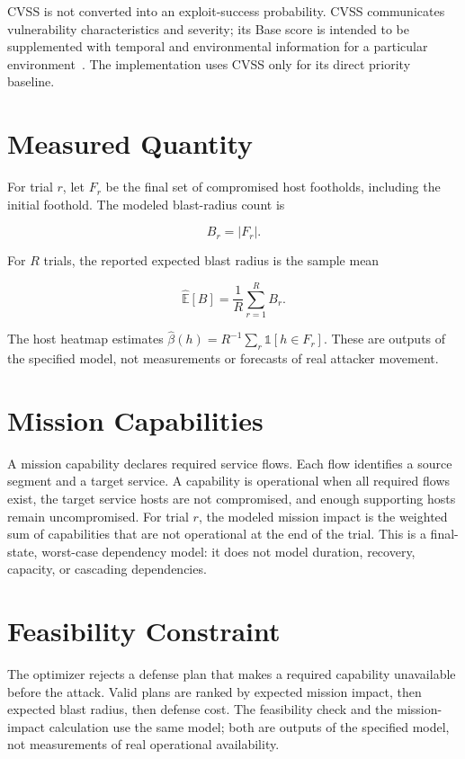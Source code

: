 CVSS is not converted into an exploit-success probability. CVSS communicates vulnerability characteristics and severity; its Base score is intended to be supplemented with temporal and environmental information for a particular environment~\cite{cvss31}. The implementation uses CVSS only for its direct priority baseline.

\section{Measured Quantity}

For trial $r$, let $F_r$ be the final set of compromised host footholds, including the initial foothold. The modeled blast-radius count is

\[
B_r = |F_r|.
\]

For $R$ trials, the reported expected blast radius is the sample mean

\[
\widehat{\mathbb{E}}[B] = \frac{1}{R}\sum_{r=1}^{R} B_r.
\]

The host heatmap estimates $\hat{\beta}(h) = R^{-1}\sum_r \mathbb{1}[h \in F_r]$. These are outputs of the specified model, not measurements or forecasts of real attacker movement.

\section{Mission Capabilities}

A mission capability declares required service flows. Each flow identifies a source segment and a target service. A capability is operational when all required flows exist, the target service hosts are not compromised, and enough supporting hosts remain uncompromised. For trial $r$, the modeled mission impact is the weighted sum of capabilities that are not operational at the end of the trial. This is a final-state, worst-case dependency model: it does not model duration, recovery, capacity, or cascading dependencies.

\section{Feasibility Constraint}

The optimizer rejects a defense plan that makes a required capability unavailable before the attack. Valid plans are ranked by expected mission impact, then expected blast radius, then defense cost. The feasibility check and the mission-impact calculation use the same model; both are outputs of the specified model, not measurements of real operational availability.

